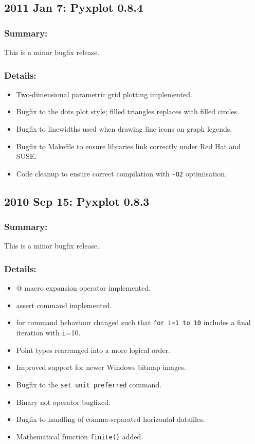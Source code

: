 \subsection*{2011 Jan 7: Pyxplot 0.8.4}

\subsubsection*{Summary:}

This is a minor bugfix release.

\subsubsection*{Details:}

\begin{itemize}
\item Two-dimensional parametric grid plotting implemented.
\item Bugfix to the dots plot style; filled triangles replaces with filled circles.
\item Bugfix to linewidths used when drawing line icons on graph legends.
\item Bugfix to Makefile to ensure libraries link correctly under Red Hat and SUSE.
\item Code cleanup to ensure correct compilation with {\tt -O2} optimisation.
\end{itemize}

\subsection*{2010 Sep 15: Pyxplot 0.8.3}

\subsubsection*{Summary:}

This is a minor bugfix release.

\subsubsection*{Details:}

\begin{itemize}
\item @ macro expansion operator implemented.
\item assert command implemented.
\item for command behaviour changed such that {\tt for i=1 to 10} includes a final iteration with {\tt i}=10.
\item Point types rearranged into a more logical order.
\item Improved support for newer Windows bitmap images.
\item Bugfix to the {\tt set unit preferred} command.
\item Binary not operator bugfixed.
\item Bugfix to handling of comma-separated horizontal datafiles.
\item Mathematical function {\tt finite()} added.
\end{itemize}

